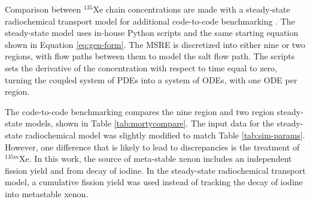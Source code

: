 \documentclass{style/nseJournal}
\begin{document}
Comparison between $^{135}$Xe chain concentrations are made with a steady-state radiochemical transport model for additional code-to-code benchmarking \cite{shahbazi_steady-state_2022}.
The steady-state model uses in-house Python scripts and the same starting equation shown in Equation \eqref{eq:gen-form}.
The MSRE is discretized into either nine or two regions, with flow paths between them to model the salt flow path.
The scripts sets the derivative of the concentration with respect to time equal to zero, turning the coupled system of PDEs into a system of ODEs, with one ODE per region.

The code-to-code benchmarking compares the nine region and two region steady-state models, shown in Table \ref{tab:mortycompare}.
The input data for the steady-state radiochemical model was slightly modified to match Table \ref{tab:sim-params}.
However, one difference that is likely to lead to discrepancies is the treatment of $^{135m}$Xe.
In this work, the source of meta-stable xenon includes an independent fission yield and from decay of iodine.
In the steady-state radiochemical transport model, a cumulative fission yield was used instead of tracking the decay of iodine into metastable xenon.
\end{document}

